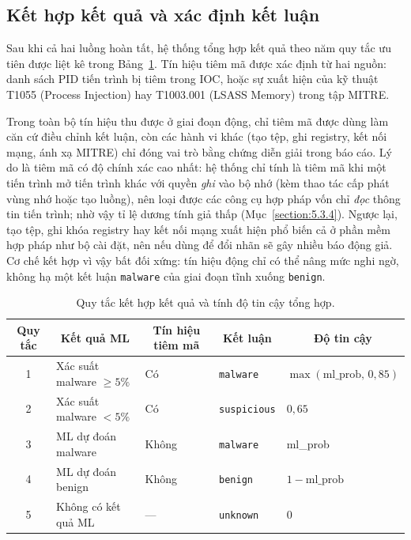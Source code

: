 \documentclass[../DoAn.tex]{subfiles}
\begin{document}
\subsection{Kết hợp kết quả và xác định kết luận}
\label{section:4.4.2}

Sau khi cả hai luồng hoàn tất, hệ thống tổng hợp kết quả theo năm
quy tắc ưu tiên được liệt kê trong Bảng~\ref{tab:verdict-impl}. Tín
hiệu tiêm mã được xác định từ hai nguồn: danh sách PID tiến trình bị
tiêm trong IOC, hoặc sự xuất hiện của kỹ thuật T1055 (Process Injection)
hay T1003.001 (LSASS Memory) trong tập MITRE.

Trong toàn bộ tín hiệu thu được ở giai đoạn động, chỉ tiêm mã được dùng
làm căn cứ điều chỉnh kết luận, còn các hành vi khác (tạo tệp, ghi
registry, kết nối mạng, ánh xạ MITRE) chỉ đóng vai trò bằng chứng diễn
giải trong báo cáo. Lý do là tiêm mã có độ chính xác cao nhất: hệ thống
chỉ tính là tiêm mã khi một tiến trình mở tiến trình khác với quyền
\emph{ghi} vào bộ nhớ (kèm thao tác cấp phát vùng nhớ hoặc tạo luồng),
nên loại được các công cụ hợp pháp vốn chỉ \emph{đọc} thông tin tiến
trình; nhờ vậy tỉ lệ dương tính giả thấp (Mục~\ref{section:5.3.4}). Ngược lại,
tạo tệp, ghi khóa registry hay kết nối mạng xuất hiện phổ biến cả ở phần
mềm hợp pháp như bộ cài đặt, nên nếu dùng để đổi nhãn sẽ gây nhiều báo
động giả. Cơ chế kết hợp vì vậy bất đối xứng: tín hiệu động chỉ có thể
nâng mức nghi ngờ, không hạ một kết luận \texttt{malware} của giai đoạn
tĩnh xuống \texttt{benign}.
\begin{table}[H]
\centering
\setlength{\tabcolsep}{4pt}
\caption{Quy tắc kết hợp kết quả và tính độ tin cậy tổng hợp.}
\label{tab:verdict-impl}
\begin{tabular}{|c|p{3cm}|p{2.4cm}|l|l|}
\hline
\multicolumn{1}{|c|}{\textbf{Quy tắc}} & \multicolumn{1}{c|}{\textbf{Kết quả ML}} & \multicolumn{1}{c|}{\textbf{Tín hiệu tiêm mã}} & \multicolumn{1}{c|}{\textbf{Kết luận}} & \multicolumn{1}{c|}{\textbf{Độ tin cậy}} \\
\hline
1 & Xác suất malware $\geq 5\%$  & Có  & \texttt{malware}    & $\max(\text{ml\_prob},\, 0{,}85)$ \\
\hline
2 & Xác suất malware $< 5\%$     & Có  & \texttt{suspicious} & $0{,}65$ \\
\hline
3 & ML dự đoán malware           & Không & \texttt{malware}  & ml\_prob \\
\hline
4 & ML dự đoán benign            & Không & \texttt{benign}   & $1 - \text{ml\_prob}$ \\
\hline
5 & Không có kết quả ML          & ---   & \texttt{unknown}  & $0$ \\
\hline
\end{tabular}
\end{table}
\end{document}
